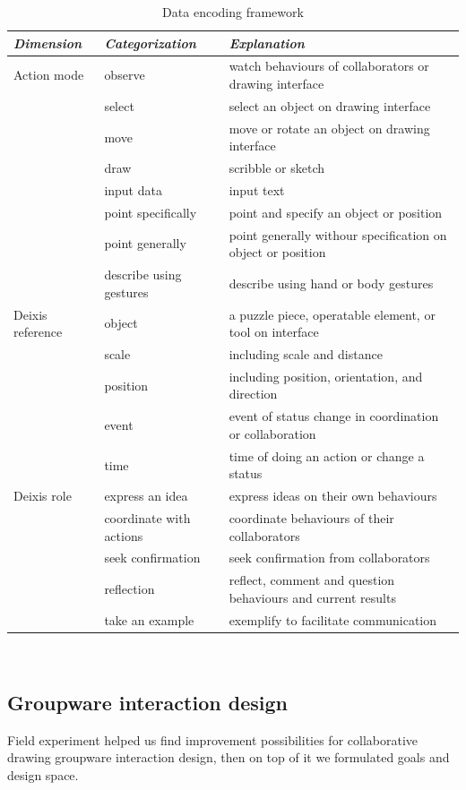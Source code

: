 \documentclass[12pt,twoside]{article}
\begin{document}
\begin{table}[h!]
  \centering
  \begin{tabular}{l l l}
    {\small\textit{Dimension}}
    & {\small \textit{Categorization}}
    & {\small \textit{Explanation}} \\
    \midrule
    Action mode & observe & watch behaviours of collaborators or drawing interface \\
       & select & select an object on drawing interface \\
     & move & move or rotate an object on drawing interface \\
     & draw & scribble or sketch\\
     & input data & input text \\
     & point specifically & point and specify an object or position \\
     & point generally & point generally withour specification on object or position\\
     & describe using gestures & describe using hand or body gestures\\     
     \midrule
    Deixis reference & object & a puzzle piece, operatable element, or tool on interface\\
     & scale & including scale and distance \\
      & position & including position, orientation, and direction \\
      &event & event of status change in coordination or collaboration\\
      &time & time of doing an action or change a status\\
      \midrule
    Deixis role & express an idea & express ideas on their own behaviours \\
    & coordinate with actions & coordinate behaviours of their collaborators\\
    & seek confirmation & seek confirmation from collaborators\\
    & reflection & reflect, comment and question behaviours and current results\\
    & take an example & exemplify to facilitate communication\\
  \end{tabular}
  \caption{Data encoding framework}~\label{tab:tableFramework}
\end{table}

\subsection{Groupware interaction design}
\label{sect:groupware}
Field experiment helped us find improvement possibilities for collaborative drawing groupware interaction design, then on top of it we formulated goals and design space.
\end{document}
